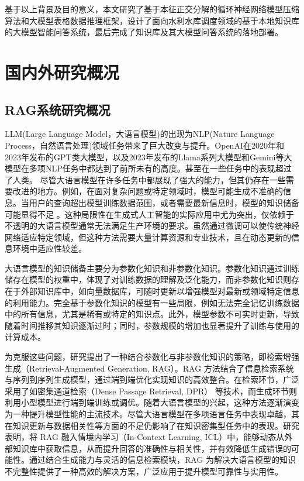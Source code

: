 基于以上背景及目的意义，本文研究了基于本征正交分解的循环神经网络模型压缩算法和大模型表格数据推理框架，设计了面向水利水库调度领域的基于本地知识库的大模型智能问答系统，最后完成了知识库及其大模型问答系统的落地部署。



\section{国内外研究概况}
\subsection{RAG系统研究概况}
LLM(Large Language Model，大语言模型)\cite{he2024annollm,weifinetuned,chen2023label,chung2024scaling,longpre2023flan}的出现为NLP(Nature Language Process，自然语言处理)领域任务带来了巨大改变与提升。OpenAI在2020年和2023年发布的GPT类大模型\cite{floridi2020gpt}，以及2023年发布的Llama\cite{touvron2023llama}系列大模型和Gemini\cite{team2023gemini}等大模型在多项NLP任务中都达到了前所未有的高度。甚至在一些任务中的表现超过了人类\cite{lu2018beyond,hendrycksmeasuring}。
尽管大语言模型在许多任务中都展现了强大的能力，但其仍存在一些需要改进的地方。例如，在面对复杂问题或特定领域时，模型可能生成不准确的信息\cite{zhang2023large}。当用户的查询超出模型训练数据范围，或者需要最新信息时，模型的知识储备可能显得不足 \cite{kandpal2023large}。这种局限性在生成式人工智能的实际应用中尤为突出，仅依赖于不透明的大语言模型通常无法满足生产环境的要求。虽然通过微调可以使传统神经网络适应特定领域，但这种方法需要大量计算资源和专业技术，且在动态更新的信息环境中适应性较差。

大语言模型的知识储备主要分为参数化知识和非参数化知识。参数化知识通过训练储存在模型的权重中，体现了对训练数据的理解及泛化能力，而非参数化知识则存在于外部知识库中，如向量数据库，可随时更新以增强模型对最新或领域特定信息的利用能力。完全基于参数化知识的模型有一些局限，例如无法完全记忆训练数据中的所有信息，尤其是稀有或特定的知识点。此外，模型参数不可实时更新，导致随着时间推移其知识逐渐过时；同时，参数规模的增加也显著提升了训练与使用的计算成本。

为克服这些问题，研究\cite{gao2023retrieval}提出了一种结合参数化与非参数化知识的策略，即检索增强生成（Retrieval-Augmented Generation, RAG）。RAG 方法结合了信息检索系统与序列到序列生成模型，通过端到端优化实现知识的高效整合。在检索环节，广泛采用了如密集通道检索（Dense Passage Retrieval, DPR）\cite{karpukhin2020dense} 等技术，而生成环节则利用小型模型进行端到端训练或调优\cite{izacard2023atlas}。随着大语言模型的兴起，这种方法逐渐演变为一种提升模型性能的主流技术。尽管大语言模型在多项语言任务中表现卓越，其在知识更新与数据相关性等方面的不足仍影响了在知识密集型任务中的表现\cite{yao2023editing,bang2023multitask}。研究\cite{he2024g}表明，将 RAG 融入情境内学习（In-Context Learning, ICL）中，能够动态从外部知识库中获取信息，从而提升回答的准确性与相关性，并有效降低生成错误的可能性。通过结合生成能力与灵活的信息检索模块，RAG 为解决大语言模型的知识不完整性提供了一种高效的解决方案，广泛应用于提升模型可靠性与实用性。


